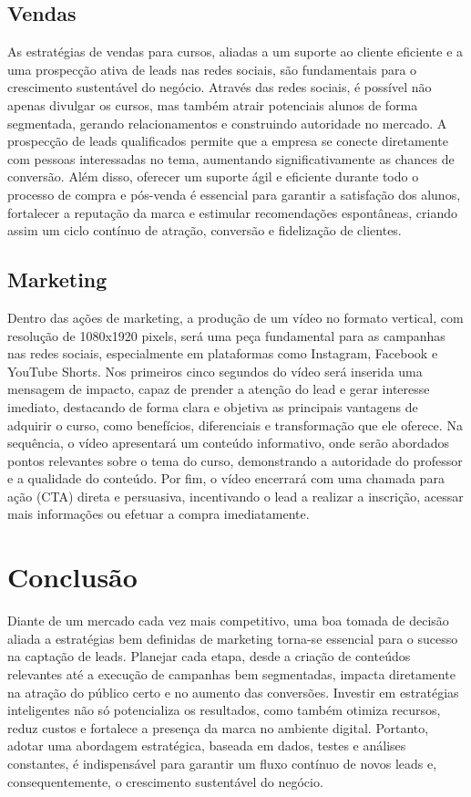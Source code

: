 \documentclass[11pt, a4paper]{article}
\begin{document}
\subsection*{Vendas}
\textsf{\color{corporategray} As estratégias de vendas para cursos, aliadas a um suporte ao cliente eficiente e a uma prospecção ativa de leads nas redes sociais, são fundamentais para o crescimento sustentável do negócio. Através das redes sociais, é possível não apenas divulgar os cursos, mas também atrair potenciais alunos de forma segmentada, gerando relacionamentos e construindo autoridade no mercado. A prospecção de leads qualificados permite que a empresa se conecte diretamente com pessoas interessadas no tema, aumentando significativamente as chances de conversão. Além disso, oferecer um suporte ágil e eficiente durante todo o processo de compra e pós-venda é essencial para garantir a satisfação dos alunos, fortalecer a reputação da marca e estimular recomendações espontâneas, criando assim um ciclo contínuo de atração, conversão e fidelização de clientes.} %

\subsection*{Marketing}
\textsf{\color{corporategray} Dentro das ações de marketing, a produção de um vídeo no formato vertical, com resolução de 1080x1920 pixels, será uma peça fundamental para as campanhas nas redes sociais, especialmente em plataformas como Instagram, Facebook e YouTube Shorts. Nos primeiros cinco segundos do vídeo será inserida uma mensagem de impacto, capaz de prender a atenção do lead e gerar interesse imediato, destacando de forma clara e objetiva as principais vantagens de adquirir o curso, como benefícios, diferenciais e transformação que ele oferece. Na sequência, o vídeo apresentará um conteúdo informativo, onde serão abordados pontos relevantes sobre o tema do curso, demonstrando a autoridade do professor e a qualidade do conteúdo. Por fim, o vídeo encerrará com uma chamada para ação (CTA) direta e persuasiva, incentivando o lead a realizar a inscrição, acessar mais informações ou efetuar a compra imediatamente.} %

\section*{Conclusão}
\textsf{\color{corporategray} Diante de um mercado cada vez mais competitivo, uma boa tomada de decisão aliada a estratégias bem definidas de marketing torna-se essencial para o sucesso na captação de leads. Planejar cada etapa, desde a criação de conteúdos relevantes até a execução de campanhas bem segmentadas, impacta diretamente na atração do público certo e no aumento das conversões. Investir em estratégias inteligentes não só potencializa os resultados, como também otimiza recursos, reduz custos e fortalece a presença da marca no ambiente digital. Portanto, adotar uma abordagem estratégica, baseada em dados, testes e análises constantes, é indispensável para garantir um fluxo contínuo de novos leads e, consequentemente, o crescimento sustentável do negócio.} %
\end{document}
